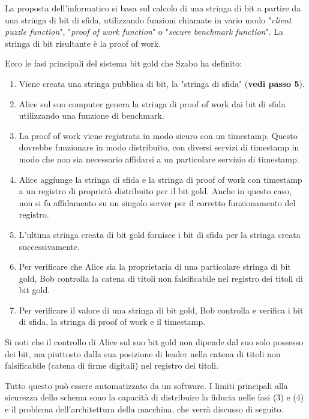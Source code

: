 La proposta dell'informatico si basa sul calcolo di una stringa di bit a partire da una stringa di bit di sfida, utilizzando funzioni chiamate in vario modo "\textit{client puzzle function}", "\textit{proof of work function}" o "\textit{secure benchmark function}". La stringa di bit risultante è la proof of work.

Ecco le fasi principali del sistema bit gold che Szabo ha definito:

\begin{enumerate}
  \item Viene creata una stringa pubblica di bit, la "stringa di sfida" (\textbf{vedi passo 5}).
  \item Alice sul suo computer genera la stringa di proof of work dai bit di sfida utilizzando una funzione di benchmark.
  \item La proof of work viene registrata in modo sicuro con un timestamp. Questo dovrebbe funzionare in modo distribuito, con diversi servizi di timestamp in modo che non sia necessario affidarsi a un particolare servizio di timestamp.
  \item Alice aggiunge la stringa di sfida e la stringa di proof of work con timestamp a un registro di proprietà distribuito per il bit gold. Anche in questo caso, non si fa affidamento su un singolo server per il corretto funzionamento del registro.
  \item L'ultima stringa creata di bit gold fornisce i bit di sfida per la stringa creata successivamente.
  \item Per verificare che Alice sia la proprietaria di una particolare stringa di bit gold, Bob controlla la catena di titoli non falsificabile nel registro dei titoli di bit gold.
  \item Per verificare il valore di una stringa di bit gold, Bob controlla e verifica i bit di sfida, la stringa di proof of work e il timestamp.
\end{enumerate}

Si noti che il controllo di Alice sul suo bit gold non dipende dal suo solo possesso dei bit, ma piuttosto dalla sua posizione di leader nella catena di titoli non falsificabile (catena di firme digitali) nel registro dei titoli.

Tutto questo può essere automatizzato da un software. I limiti principali alla sicurezza dello schema sono la capacità di distribuire la fiducia nelle fasi (3) e (4) e il problema dell'architettura della macchina, che verrà discusso di seguito.

